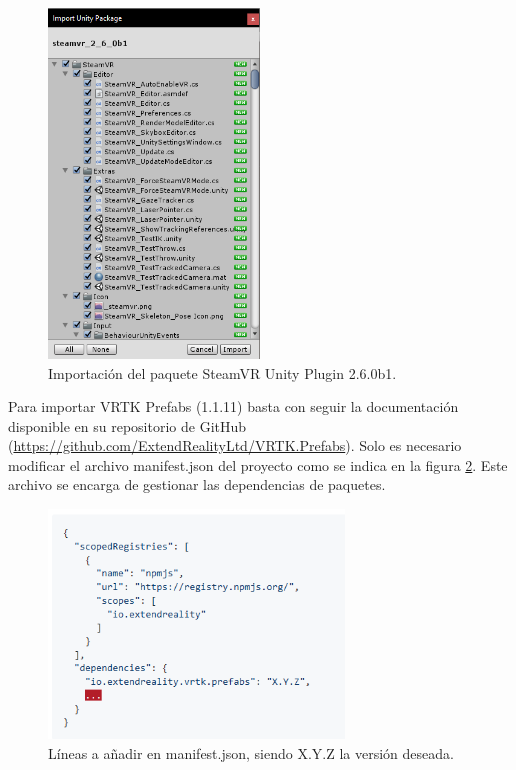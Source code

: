 \begin{figure}
  \centering
    \includegraphics[width=0.5\textwidth]{04.Desarrollo/01.Entrega1/01.Iteracion1_1/00.Figuras/01.steam_vr_import.png}
    \caption{Importación del paquete SteamVR Unity Plugin 2.6.0b1.}
    \label{fig:SteamVRimport}
\end{figure}


Para importar VRTK Prefabs (1.1.11) basta con seguir la documentación disponible en su repositorio de GitHub (\url{https://github.com/ExtendRealityLtd/VRTK.Prefabs}). Solo es necesario modificar el archivo manifest.json del proyecto como se indica en la figura \ref{fig:vrtkPackage}. Este archivo se encarga de gestionar las dependencias de paquetes.

\begin{figure}
  \centering
    \includegraphics[width=0.7\textwidth]{04.Desarrollo/01.Entrega1/01.Iteracion1_1/00.Figuras/02.vrtk_package.png}
    \caption{Líneas a añadir en manifest.json, siendo X.Y.Z la versión deseada.}
    \label{fig:vrtkPackage}
\end{figure}

